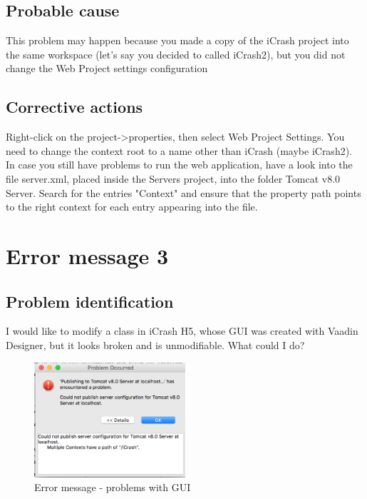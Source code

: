 \subsection{Probable cause}
This problem may happen because you made a copy of the iCrash project into the
same workspace (let's say you decided to called iCrash2), but you did not change
the Web Project settings configuration\\

\subsection{Corrective actions}
Right-click on the project->properties, then select Web Project Settings. You
need to change the context root to a name other than iCrash (maybe iCrash2).\\
In case you still have problems to run the web application, have a look into the file server.xml, placed inside the Servers project, into the folder Tomcat v8.0 Server. Search for the entries "Context" and ensure that the property path points to the right context for each entry appearing into the file.
 

\section{Error message 3}

\subsection{Problem identification}
I would like to modify a class in iCrash H5, whose GUI was created with Vaadin
Designer, but it looks broken and is unmodifiable. What could I do?\\

\begin{figure}
\begin{center}
\includegraphics[width=0.5\textwidth]{./images/er2.eps}
\end{center}
\caption{Error message - problems with GUI}
\end{figure}

